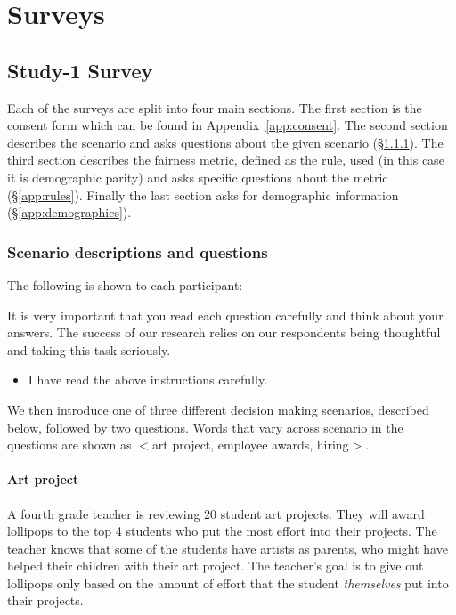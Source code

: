 \documentclass{article}
\newcommand{\studyA}{Study-1}
\newcommand{\checkbox}{\text{\fboxsep=-.15pt\fbox{\rule{0pt}{1.5ex}\rule{1.5ex}{0pt}}}}
\begin{document}
\section{Surveys} \label{app:survey}

\subsection{\studyA{} Survey} \label{app:surveyA}

Each of the surveys are split into four main sections. The first section is the consent form which can be found in Appendix~\ref{app:consent}. The second section describes the scenario and asks questions about the given scenario (\S\ref{app:scenarios}). The third section describes the fairness metric, defined as the rule, used (in this case it is demographic parity) and asks specific questions about the metric (\S\ref{app:rules}). Finally the last section asks for demographic information (\S\ref{app:demographics}).

\subsubsection{Scenario descriptions and questions}\label{app:scenarios}
The following is shown to each participant:

It is very important that you read each question carefully and think about your answers. The success of our research relies on our respondents being thoughtful and taking this task seriously.
\begin{itemize}
    \item[\checkbox] I have read the above instructions carefully.
\end{itemize}

We then introduce one of three different decision making scenarios, described below, followed by two questions. Words that vary across scenario in the questions are shown as $<$art project, employee awards, hiring$>$.

\paragraph{Art project}
A fourth grade teacher is reviewing 20 student art projects. They will award lollipops to the top 4 students who put the most effort into their projects. The teacher knows that some of the students have artists as parents, who might have helped their children with their art project. The teacher’s goal is to give out lollipops only based on the amount of effort that the student \emph{themselves} put into their projects.
\end{document}
